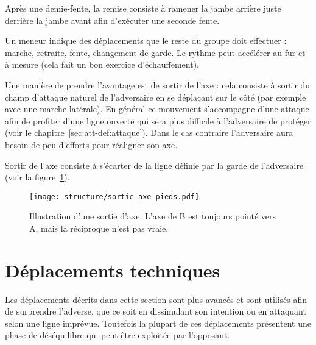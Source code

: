 \begin{definition}

	Après une demie-fente, la remise consiste à ramener la jambe arrière juste derrière la jambe avant afin d'exécuter une seconde fente.
\end{definition}


\begin{exercice}


	Un meneur indique des déplacements que le reste du groupe doit effectuer : marche, retraite, fente, changement de garde.
	Le rythme peut accélérer au fur et à mesure (cela fait un bon exercice d'échauffement).
\end{exercice}


Une manière de prendre l'avantage est de sortir de l'axe : cela consiste à sortir du champ d'attaque naturel de l'adversaire en se déplaçant sur le côté (par exemple avec une marche latérale).
En général ce mouvement s'accompagne d'une attaque afin de profiter d'une ligne ouverte qui sera plus difficile à l'adversaire de protéger (voir le chapitre~\ref{sec:att-def:attaque}).
Dans le cas contraire l'adversaire aura besoin de peu d'efforts pour réaligner son axe.


\begin{definition}
	\label{dep:def:sortie-axe}

	Sortir de l'axe consiste à s'écarter de la ligne définie par la garde de l'adversaire (voir la figure~\ref{def:fig:sortie-garde}).
\end{definition}


\begin{figure}[ht]
	\centering
	\texttt{[image: structure/sortie\_axe\_pieds.pdf]}
	\caption{Illustration d'une sortie d'axe.
	L'axe de B est toujours pointé vers A, mais la réciproque n'est pas vraie.}
	\label{def:fig:sortie-garde}
\end{figure}


\section{Déplacements techniques}


Les déplacements décrits dans cette section sont plus avancés et sont utilisés afin de surprendre l'adverse, que ce soit en dissimulant son intention ou en attaquant selon une ligne imprévue.
Toutefois la plupart de ces déplacements présentent une phase de déséquilibre qui peut être exploitée par l'opposant.

